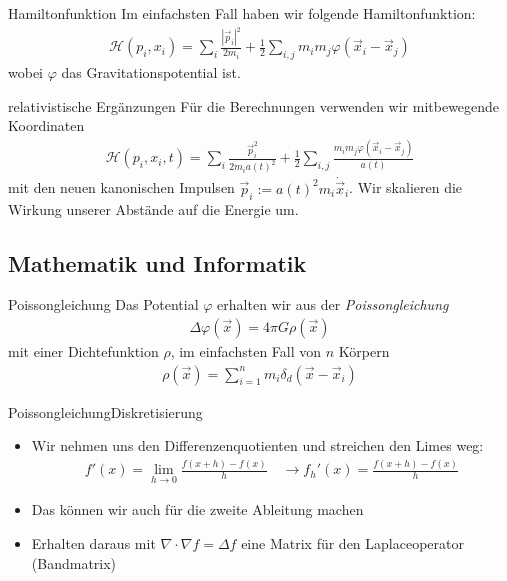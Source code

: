 \documentclass{beamer}
\begin{document}
\begin{frame}{Hamiltonfunktion}
  Im einfachsten Fall haben wir folgende Hamiltonfunktion:
  \begin{align}
    \mathcal H(p_i,x_i) = \sum_i \frac{\left|\vec{p}_i\right|^2}{2m_i} +
    \frac{1}{2}\sum_{i,j} {m_i m_j \varphi(\vec{x}_i - \vec{x}_j)}
    \label{eqn:hamilton}
  \end{align}
  wobei $\varphi$ das Gravitationspotential ist.
\end{frame}

\begin{frame}{relativistische Ergänzungen}
  Für die Berechnungen verwenden wir \alert{mitbewegende Koordinaten}
  \begin{align}
    \mathcal H(p_i,x_i,t) = \sum_i \frac{\vec{p}_i^2}{2m_i a(t)^2} +
    \frac{1}{2}\sum_{i,j} \frac{m_i m_j \varphi(\vec{x}_i - \vec{x}_j)}{a(t)}
    \label{eqn:hamilton_rel}
  \end{align}
  mit den neuen kanonischen Impulsen $\vec p_i := a(t)^2 m_i\dot{\vec{x}}_i$.
  \pause
  \vskip10pt
  Wir skalieren die Wirkung unserer Abstände auf die Energie um.
\end{frame}

\subsection{Mathematik und Informatik}
\begin{frame}{Poissongleichung}
  Das Potential $\varphi$ erhalten wir aus der \emph{Poissongleichung}
  \begin{align}
    \Delta \varphi(\vec{x}) = 4\pi G \rho(\vec{x})
  \end{align}
  mit einer Dichtefunktion $\rho$, im einfachsten Fall von $n$ Körpern
  \begin{align}
    \rho(\vec x) = \sum_{i=1}^n m_i \delta_d(\vec{x} - \vec{x}_i)
  \end{align}
\end{frame}

\begin{frame}{Poissongleichung}{Diskretisierung}
  \begin{itemize}
    \item<1-> Wir nehmen uns den Differenzenquotienten und streichen den Limes weg:
      \begin{align}
        f'(x) = \lim_{h\to 0} \frac{f(x+h) - f(x)}{h} \quad \to f_h'(x) =
        \frac{f(x + h) - f(x)}{h}
      \end{align}
    \item<2-> Das können wir auch für die zweite Ableitung machen
    \item<3-> Erhalten daraus mit $\nabla \cdot \nabla f = \Delta f$ eine Matrix für
      den Laplaceoperator (Bandmatrix)
  \end{itemize}
\end{frame}
\end{document}
